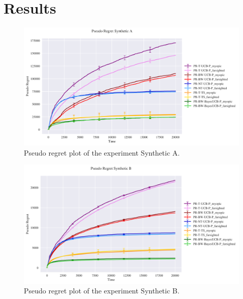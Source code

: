 \section{Results}

\begin{figure}[H]
	\includegraphics[width=16cm]{./images/ANALYTICS/experiment_A ANALYTICS.png}
	\centering	
	\caption{Pseudo regret plot of the experiment Synthetic A.}
	\label{f:a}
\end{figure}
\begin{figure}[H]
	\includegraphics[width=16cm]{./images/ANALYTICS/experiment_B ANALYTICS.png}
	\centering	
	\caption{Pseudo regret plot of the experiment Synthetic B. }
	\label{f:b}
\end{figure}

